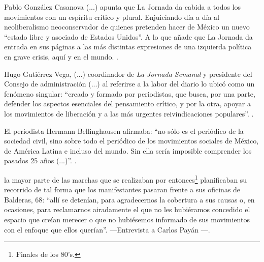 \documentclass[letterpaper, 11pt]{book}
\theoremstyle{definition}
\theoremstyle{remark}
\begin{document}
\begin{center}
    \begin{minipage}{0.9\linewidth}
        {\setlength{\parindent}{12pt}\small
	      Pablo González Casanova (...) apunta que La Jornada da cabida a todos los movimientos con un espíritu crítico y plural. Enjuiciando día a día al neoliberalismo neoconservador de quienes pretenden hacer de México un nuevo ``estado libre y asociado de Estados Unidos''. 
	      A lo que añade que La Jornada da entrada en sus páginas a las más distintas expresiones de una izquierda política en grave crisis, aquí y en el mundo. \normalsize \citep[450--451]{2011_Tesis_LaJornada}.
        }
    \end{minipage}
\end{center}


\begin{center}
    \begin{minipage}{0.9\linewidth}
        {\setlength{\parindent}{12pt}\small
	     Hugo Gutiérrez Vega, (...) coordinador de \emph{La Jornada Semanal} y presidente del Consejo de administración (...) al referirse a la labor del diario lo ubicó como un fenómeno singular: ``creado y formado por periodistas, que busca, por una parte, defender los aspectos esenciales del pensamiento crítico, y por la otra, apoyar a los movimientos de liberación y a las más urgentes reivindicaciones populares''. \normalsize \citep[456]{2011_Tesis_LaJornada}.
        }
    \end{minipage}
\end{center}

\begin{center}
    \begin{minipage}{0.9\linewidth}
        {\setlength{\parindent}{12pt}\small
	    El periodista Hermann Bellinghausen afirmaba: ``no sólo es el periódico de la sociedad civil, sino sobre todo el periódico de los movimientos sociales de México, de América Latina e incluso del mundo. Sin ella sería imposible comprender los pasados 25 años (...)''. \normalsize \citep[458]{2011_Tesis_LaJornada}.
        }
    \end{minipage}
\end{center}


\begin{center}
    \begin{minipage}{0.9\linewidth}
        {\setlength{\parindent}{12pt}\small
	    la mayor parte de las marchas que se realizaban por entonces\footnote{Finales de los 80's.} planificaban su recorrido de tal forma que los manifestantes pasaran frente a sus oficinas de Balderas, 68: ``allí se detenían, para agradecernos la cobertura a sus causas o, en ocasiones, para reclamarnos airadamente el que no les hubiéramos concedido el espacio que creían merecer o que no hubiésemos informado de sus movimientos con el enfoque que ellos querían''. ---Entrevista a Carlos Payán \normalsize \citep[378]{2011_Tesis_LaJornada}---.
        }
    \end{minipage}
\end{center}
\end{document}
